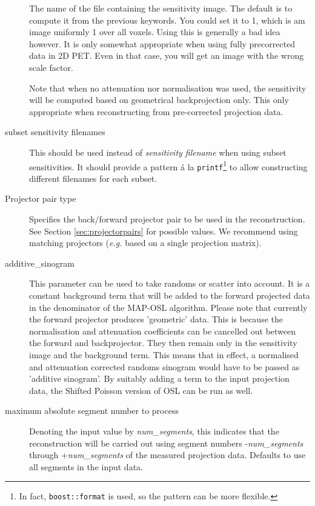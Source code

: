 \documentclass{article}
\begin{document}
\begin{description}
The name of the file containing the sensitivity image. The 
default is to compute it from the previous keywords. You could 
set it to 1, which is am image uniformly 1 over all voxels. 
Using this is generally a bad idea however. It is 
only somewhat appropriate when using fully precorrected data 
in 2D PET. Even in that case, you will get an image with the 
wrong scale factor.

Note that when no attenuation nor normalisation was used, 
the sensitivity will be computed based on geometrical backprojection
only. This only appropriate when reconstructing 
from pre-corrected projection data.

\item[subset sensitivity filenames]
This should be used instead of \textit{sensitivity filename} when using subset
sensitivities. It should provide a pattern \'{a} la \texttt{printf}\footnote{In fact,
\texttt{boost::format} is used, so the pattern can be more flexible.} to allow
constructing different filenames for each subset.


\item[Projector pair type]
Specifies the back/forward projector pair to be used in the reconstruction. 
See Section \ref{sec:projectorpairs} for possible values. We recommend using matching
projectors (\textit{e.g.} based on a single projection matrix).


\item[additive\_sinogram]
This parameter can be used to take randoms or scatter into account. 
It is a constant background term that will be added to the forward 
projected data in the denominator of the MAP-OSL algorithm. Please 
note that currently the forward projector produces 'geometric' 
data. This is because the normalisation and attenuation coefficients 
can be cancelled out between the forward and backprojector. They 
then remain only in the sensitivity image and the background 
term. This means that in effect, a normalised and attenuation 
corrected randoms sinogram would have to be passed as 'additive 
sinogram'. By suitably adding a term to the input projection 
data, the Shifted Poisson version of OSL can be run as well.


\item[maximum absolute segment number to process]
Denoting the input value by \textit{num\_segments}, this indicates 
that the reconstruction will be carried out using segment numbers 
-\textit{num\_segments} through +\textit{num\_segments} of the measured 
projection data. Defaults to use all segments in the input data.



\end{description}
\end{document}
